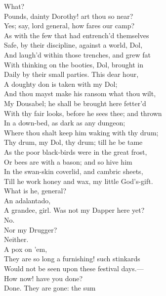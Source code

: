 \documentclass[a4paper,oneside]{memoir}
\begin{document}
\begin{drama*}
\dolspeaks What?\\
\facespeaks {} Pounds, dainty Dorothy! art thou so near?\\
\dolspeaks Yes; say, lord general, how fares our camp?\\
\facespeaks As with the few that had entrench'd themselves\\
Safe, by their discipline, against a world, Dol,\\
And laugh'd within those trenches, and grew fat\\
With thinking on the booties, Dol, brought in\\
Daily by their small parties. This dear hour,\\
A doughty don is taken with my Dol;\\
And thou mayst make his ransom what thou wilt,\\
My Dousabel; he shall be brought here fetter'd\\
With thy fair looks, before he sees thee; and thrown\\
In a down-bed, as dark as any dungeon;\\
Where thou shalt keep him waking with thy drum;\\
Thy drum, my Dol, thy drum; till he be tame\\
As the poor black-birds were in the great frost,\\
Or bees are with a bason; and so hive him\\
In the swan-skin coverlid, and cambric sheets,\\
Till he work honey and wax, my little God's-gift.\\
\dolspeaks What is he, general?\\
\facespeaks {} An adalantado,\\
A grandee, girl. Was not my Dapper here yet?\\
\dolspeaks No.\\
\facespeaks {} Nor my Drugger?\\
\dolspeaks {} Neither.\\
\facespeaks {} A pox on 'em,\\
They are so long a furnishing! such stinkards\\
Would not be seen upon these festival days.---\\
How now! have you done?\\
\subtlespeaks {} Done. They are gone: the sum\\

\end{drama*}
\end{document}

